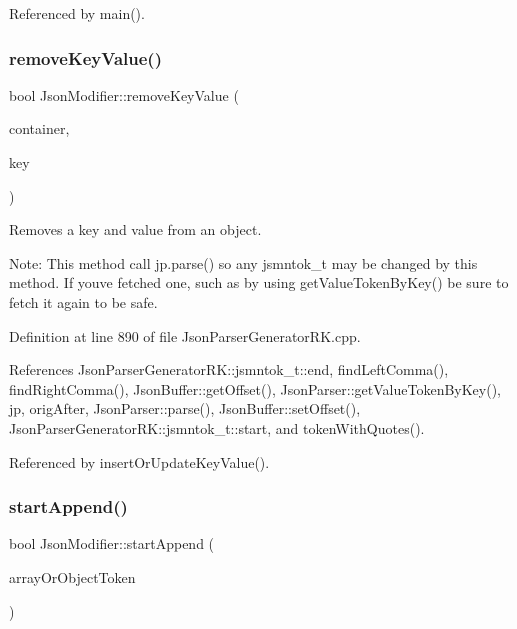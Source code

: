 Referenced by main().

\mbox{\label{class_json_modifier_aadf76d2cef6b1a6ffe7868031cfb0e11}} 
\subsubsection{\texorpdfstring{remove\+Key\+Value()}{removeKeyValue()}}
{\footnotesize\ttfamily bool Json\+Modifier\+::remove\+Key\+Value (\begin{DoxyParamCaption}\item[{const \hyperlink{struct_json_parser_generator_r_k_1_1jsmntok__t}{Json\+Parser\+Generator\+R\+K\+::jsmntok\+\_\+t} $\ast$}]{container,  }\item[{const char $\ast$}]{key }\end{DoxyParamCaption})}



Removes a key and value from an object. 

Note\+: This method call jp.\+parse() so any jsmntok\+\_\+t may be changed by this method. If you\textquotesingle{}ve fetched one, such as by using get\+Value\+Token\+By\+Key() be sure to fetch it again to be safe. 

Definition at line 890 of file Json\+Parser\+Generator\+R\+K.\+cpp.



References Json\+Parser\+Generator\+R\+K\+::jsmntok\+\_\+t\+::end, find\+Left\+Comma(), find\+Right\+Comma(), Json\+Buffer\+::get\+Offset(), Json\+Parser\+::get\+Value\+Token\+By\+Key(), jp, orig\+After, Json\+Parser\+::parse(), Json\+Buffer\+::set\+Offset(), Json\+Parser\+Generator\+R\+K\+::jsmntok\+\_\+t\+::start, and token\+With\+Quotes().



Referenced by insert\+Or\+Update\+Key\+Value().

\mbox{\label{class_json_modifier_ab5bf356377a71120588413a4be998607}} 
\subsubsection{\texorpdfstring{start\+Append()}{startAppend()}}
{\footnotesize\ttfamily bool Json\+Modifier\+::start\+Append (\begin{DoxyParamCaption}\item[{const \hyperlink{struct_json_parser_generator_r_k_1_1jsmntok__t}{Json\+Parser\+Generator\+R\+K\+::jsmntok\+\_\+t} $\ast$}]{array\+Or\+Object\+Token }\end{DoxyParamCaption})}



